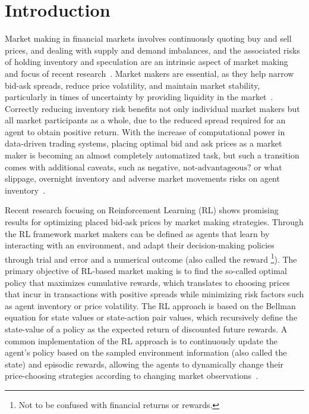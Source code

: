 \section{Introduction}
\label{sec:introduction}

Market making in financial markets involves continuously quoting buy and sell prices, and dealing with supply and demand imbalances,
and the associated risks of holding inventory and speculation are an intrinsic aspect of market making and focus of recent research~\cite{Cartea2015, Gasperov2021}.
Market makers are essential, as they help narrow bid-ask spreads, reduce price volatility, and maintain market stability,
particularly in times of uncertainty by providing liquidity in the market~\cite{Glosten1985, OHara1995}.
Correctly reducing inventory risk benefits not only individual market makers but all market participants as a whole, 
due to the reduced spread required for an agent to obtain positive return.
With the increase of computational power in data-driven trading systems, 
placing optimal bid and ask prices as a market maker is becoming an almost completely automatized task,
but such a transition comes with additional caveats, such as $\text{negative, not-advantageous? or what}$ slippage, overnight inventory and adverse market movements risks on agent inventory~\cite{Cartea2015, Avellaneda2008}.

Recent research focusing on Reinforcement Learning (RL) shows promising results for optimizing placed bid-ask prices by market making strategies.
Through the RL framework market makers can be defined as agents that learn by interacting with an environment,
and adapt their decision-making policies through trial and error and a numerical outcome
(also called the reward \footnote{Not to be confused with financial returns or rewards.}).
The primary objective of RL-based market making is to find the so-called optimal policy that maximizes cumulative rewards,
which translates to choosing prices that incur in transactions with positive spreads while minimizing risk factors such as agent inventory or price volatility.
The RL approach is based on the Bellman equation for state values or state-action pair values,
which recursively define the state-value of a policy as the expected return of discounted future rewards.
A common implementation of the RL approach is to continuously update the agent's policy based on the sampled environment information (also called the state) and episodic rewards,
allowing the agents to dynamically change their price-choosing strategies according to changing market observations~\cite{Sutton2018}.

